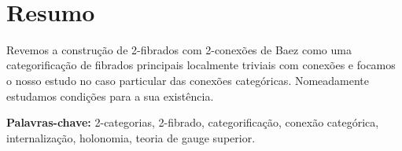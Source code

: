 \parbox[t][2cm][c]{\textwidth}{~\vfill}
\section*{Resumo}


Revemos a construção de 2-fibrados com 2-conexões de Baez como uma categorificação de fibrados principais localmente triviais com conexões e focamos o nosso estudo no caso particular das conexões categóricas. Nomeadamente estudamos condições para a sua existência.
\vfill

\textbf{\Large Palavras-chave:} 2-categorias, 2-fibrado, categorifica\c{c}\~ao, conexão categórica, internaliza\c{c}\~ao, holonomia, teoria de gauge superior.

